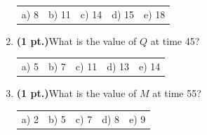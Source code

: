 \documentclass{article}
\begin{document}
\begin{enumerate}
\begin{tabular}{p{0.6in} p{0.6in} p{0.6in} p{0.6in} l}
a) 8  & b) 11  & c) 14 & d) 15  & e) 18
\end{tabular}

\item {\bf (1 pt.)}What is the value of $Q$ at time 45?

\begin{tabular}{p{0.6in} p{0.6in} p{0.6in} p{0.6in} l}
a) 5  & b) 7  & c) 11 & d) 13  & e) 14
\end{tabular}

\item {\bf (1 pt.)}What is the value of $M$ at time 55?

\begin{tabular}{p{0.6in} p{0.6in} p{0.6in} p{0.6in} l}
a) 2  & b) 5  & c) 7 & d) 8  & e) 9
\end{tabular}
\end{enumerate}
\end{document}
